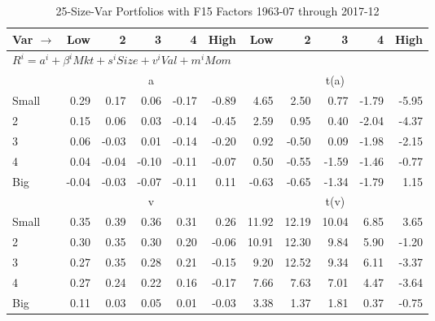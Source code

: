 
\begin{table}[!ht]
\footnotesize
\centering
\caption{25-Size-Var Portfolios with F15 Factors 1963-07 through 2017-12}
\begin{tabular}{lrrrrrrrrrr}
  \toprule
    Var $\rightarrow$ & Low & 2 & 3 & 4 & High & Low & 2 & 3 & 4 & High \\ 
  \midrule
  \multicolumn{11}{l}{$R^i=a^i+\beta^iMkt+s^iSize+v^iVal+m^iMom$} \\

  
    
      & \multicolumn{5}{c}{a} & \multicolumn{5}{c}{t(a)}
    
    \\
      \cmidrule(r){2-6} \cmidrule(r){7-11}

    Small   & 0.29  & 0.17  & 0.06  & -0.17  & -0.89  & 4.65  & 2.50  & 0.77  & -1.79  & -5.95  \\
         2  & 0.15  & 0.06  & 0.03  & -0.14  & -0.45  & 2.59  & 0.95  & 0.40  & -2.04  & -4.37  \\
         3  & 0.06  & -0.03  & 0.01  & -0.14  & -0.20  & 0.92  & -0.50  & 0.09  & -1.98  & -2.15  \\
         4  & 0.04  & -0.04  & -0.10  & -0.11  & -0.07  & 0.50  & -0.55  & -1.59  & -1.46  & -0.77  \\
    Big     & -0.04  & -0.03  & -0.07  & -0.11  & 0.11  & -0.63  & -0.65  & -1.34  & -1.79  & 1.15  \\

  
    
      & \multicolumn{5}{c}{v} & \multicolumn{5}{c}{t(v)}
    
    \\
      \cmidrule(r){2-6} \cmidrule(r){7-11}

    Small   & 0.35  & 0.39  & 0.36  & 0.31  & 0.26  & 11.92  & 12.19  & 10.04  & 6.85  & 3.65  \\
         2  & 0.30  & 0.35  & 0.30  & 0.20  & -0.06  & 10.91  & 12.30  & 9.84  & 5.90  & -1.20  \\
         3  & 0.27  & 0.35  & 0.28  & 0.21  & -0.15  & 9.20  & 12.52  & 9.34  & 6.11  & -3.37  \\
         4  & 0.27  & 0.24  & 0.22  & 0.16  & -0.17  & 7.66  & 7.63  & 7.01  & 4.47  & -3.64  \\
    Big     & 0.11  & 0.03  & 0.05  & 0.01  & -0.03  & 3.38  & 1.37  & 1.81  & 0.37  & -0.75  \\

  
    

\end{tabular}
\end{table}
